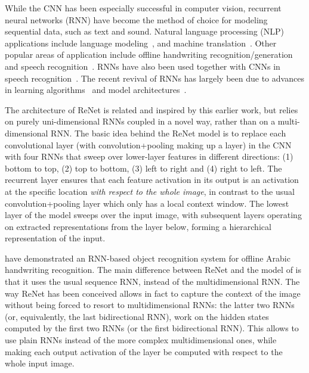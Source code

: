 While the CNN has been especially successful in computer vision, recurrent
neural networks (RNN) have become the method of choice for modeling sequential
data, such as text and sound. Natural language processing (NLP) applications
include language modeling~\citep[see, e.g.,][]{Mikolov-thesis-2012}, and
machine translation~\citep{Sutskever-et-al-NIPS2014,Cho2014,
bahdanau2014neural}. Other popular areas of application include offline
handwriting recognition/generation~\citep{Graves+Schmidhuber-2009,
Graves-et-al-NIPS2007,Graves-arxiv2013} and speech recognition~\citep{
Chorowski-et-al-arxiv2014,Graves+Jaitly-ICML2014}. RNNs have also been used
together with CNNs in speech recognition~\citep{sainath2015}. The recent
revival of RNNs has largely been due to advances in learning
algorithms~\citep{Pascanu+al-ICML2013-small,Martens+Sutskever-ICML2011} and
model architectures~\citep{Pascanu-et-al-ICLR2014,Hochreiter+Schmidhuber-1997,
Cho2014}.

The architecture of ReNet is related and inspired by this earlier work, but
relies on purely uni-dimensional RNNs coupled in a novel way, rather than on a
multi-dimensional RNN. The basic idea behind the ReNet model is to replace each
convolutional layer (with convolution+pooling making up a layer) in the CNN
with four RNNs that sweep over lower-layer features in different directions:
(1) bottom to top, (2) top to bottom, (3) left to right and (4) right to left.
The recurrent layer ensures that each feature activation in its output is an
activation at the specific location \emph{with respect to the whole image}, in
contrast to the usual convolution+pooling layer which only has a local context
window. The lowest layer of the model sweeps over the input image, with
subsequent layers operating on extracted representations from the layer below,
forming a hierarchical representation of the input.

\citet{Graves+Schmidhuber-2009} have demonstrated an RNN-based object
recognition system for offline Arabic handwriting recognition. The main
difference between ReNet and the model of \citet{Graves+Schmidhuber-2009} is
that it uses the usual sequence RNN, instead of the multidimensional RNN. The
way ReNet has been conceived allows in fact to capture the context of the
image without being forced to resort to multidimensional RNNs: the latter two
RNNs (or, equivalently, the last bidirectional RNN), work on the hidden states
computed by the first two RNNs (or the first bidirectional RNN). This allows
to use plain RNNs instead of the more complex multidimensional ones, while
making each output activation of the layer be computed with respect to the
whole input image.

